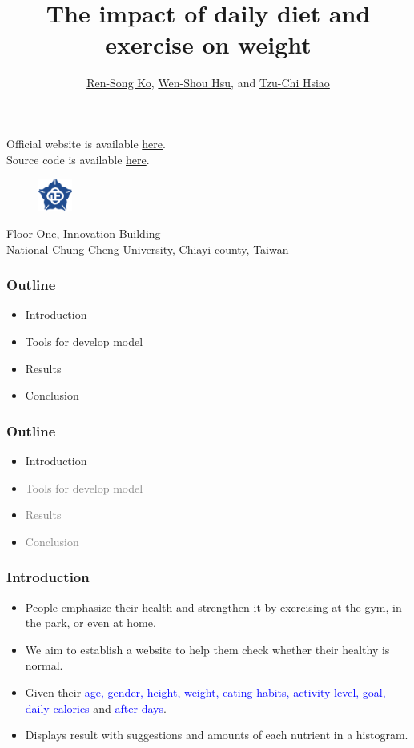 \documentclass[fleqn]{beamer}
\title{The impact of daily diet and exercise on weight}
\author{\href{mailto: korenson@cs.ccu.edu.tw}{Ren-Song Ko}, \href{mailto: wisleyqqq0630@alum.ccu.edu.tw}{Wen-Shou Hsu}, and  \href{mailto: stchi111u@cs.ccu.edu.tw}{Tzu-Chi Hsiao}}
\date{}
\begin{document}
\begin{frame}
\titlepage
\begin{center}
Official website is available \href{https://tomtchsiao.github.io/project/}{here}. \\
Source code is available \href{https://tomtchsiao.github.io/project/下載/index.html}{here}.
\end{center}
\begin{figure}[h]
\centering
\includegraphics[width=0.10\textwidth]{logo.png}
\end{figure}
\begin{center}
Floor One, Innovation Building \\
National Chung Cheng University, Chiayi county, Taiwan
\end{center}
\end{frame}
\begin{frame}
\frametitle{Outline}
\begin{itemize}
\item Introduction \\
\item Tools for develop model \\
\item Results \\
\item Conclusion
\end{itemize}
\end{frame}
\begin{frame}
\frametitle{Outline}
\begin{itemize}
\item Introduction \\
\item \textcolor{gray}{Tools for develop model} \\
\item \textcolor{gray}{Results} \\
\item \textcolor{gray}{Conclusion}
\end{itemize}
\end{frame}
\begin{frame}
\frametitle{Introduction}
\begin{itemize}
\item People emphasize their health and strengthen it by exercising at the gym, in the park, or even at home. \\
\item We aim to establish a website to help them check whether their \alert{healthy} is normal. \\
\item Given their \textcolor{blue}{age, gender, height, weight, eating habits, activity level, goal, daily calories} and \textcolor{blue}{after days}. \\
\item Displays result with suggestions and amounts of each nutrient in a histogram. 
\end{itemize}
\end{frame}
\end{document}
